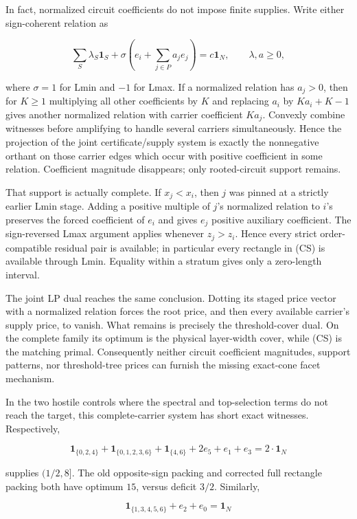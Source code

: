 \documentclass[11pt]{article}
\begin{document}
In fact, normalized circuit coefficients do not impose finite supplies.
Write either sign-coherent relation as

\[
 \sum_S\lambda_S\mathbf 1_S
 +\sigma\left(e_i+\sum_{j\in P}a_je_j\right)=c\mathbf 1_N,
 \qquad \lambda,a\ge0,
\]

where $\sigma=1$ for Lmin and $-1$ for Lmax.  If a normalized relation has
$a_j>0$, then for $K\ge1$ multiplying all other coefficients by $K$ and
replacing $a_i$ by $Ka_i+K-1$ gives another normalized relation with carrier
coefficient $Ka_j$.  Convexly combine witnesses before amplifying to handle
several carriers simultaneously.  Hence the projection of the joint
certificate/supply system is exactly the nonnegative orthant on those
carrier edges which occur with positive coefficient in some relation.
Coefficient magnitude disappears; only rooted-circuit support remains.

That support is actually complete.  If $x_j<x_i$, then $j$ was pinned at a
strictly earlier Lmin stage.  Adding a positive multiple of $j$'s normalized
relation to $i$'s preserves the forced coefficient of $e_i$ and gives $e_j$
positive auxiliary coefficient.  The sign-reversed Lmax argument applies
whenever $z_j>z_i$.  Hence every strict order-compatible residual pair is
available; in particular every rectangle in (CS) is available through Lmin.
Equality within a stratum gives only a zero-length interval.

The joint LP dual reaches the same conclusion.  Dotting its staged price
vector with a normalized relation forces the root price, and then every
available carrier's supply price, to vanish.  What remains is precisely the
threshold-cover dual.  On the complete family its optimum is the physical
layer-width cover, while (CS) is the matching primal.  Consequently neither
circuit coefficient magnitudes, support patterns, nor threshold-tree prices
can furnish the missing exact-cone facet mechanism.

In the two hostile controls where the spectral and top-selection terms do
not reach the target, this complete-carrier system has short exact witnesses.
Respectively,

\[
 \mathbf 1_{\{0,2,4\}}+\mathbf 1_{\{0,1,2,3,6\}}
 +\mathbf 1_{\{4,6\}}
 +2e_5+e_1+e_3=2\cdot\mathbf 1_N
\]

supplies $(1/2,8]$.  The old opposite-sign packing and corrected full
rectangle packing both have optimum $15$, versus deficit $3/2$.
Similarly,

\[
 \mathbf 1_{\{1,3,4,5,6\}}+e_2+e_0=\mathbf 1_N
\]
\end{document}
